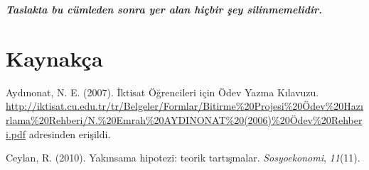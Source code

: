 \documentclass[
  12pt,
]{article}
\newlength{\cslhangindent}
\newlength{\cslentryspacingunit} %
\newenvironment{CSLReferences}[2] %
 {%
  \setlength{\parindent}{0pt}
  \ifodd #1
  \let\oldpar\par
  \def\par{\hangindent=\cslhangindent\oldpar}
  \fi
  \setlength{\parskip}{#2\cslentryspacingunit}
 }%
 {}
\begin{document}
\textbf{\emph{Taslakta bu cümleden sonra yer alan hiçbir şey silinmemelidir.}}

\newpage

\hypertarget{references}{%
\section{Kaynakça}\label{references}}

\hypertarget{refs}{}
\begin{CSLReferences}{1}{0}
\leavevmode{}%
Aydınonat, N. E. (2007). İktisat Öğrencileri için Ödev Yazma Kılavuzu. \url{http://iktisat.cu.edu.tr/tr/Belgeler/Formlar/Bitirme\%20Projesi\%20Ödev\%20Hazırlama\%20Rehberi/N.\%20Emrah\%20AYDINONAT\%20(2006)\%20Ödev\%20Rehberi.pdf} adresinden erişildi.

\leavevmode{}%
Ceylan, R. (2010). Yak{ı}nsama hipotezi: teorik tart{ı}{ş}malar. \emph{Sosyoekonomi}, \emph{11}(11).

\end{CSLReferences}
\end{document}
